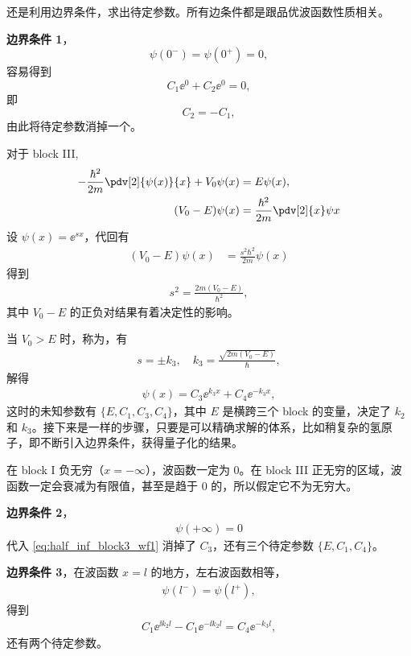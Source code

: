 还是利用边界条件，求出待定参数。所有边条件都是跟品优波函数性质相关。

\textbf{边界条件 1}，
\begin{equation}
    \psi(0^-) = \psi(0^+) = 0,
\end{equation}
容易得到
\begin{equation}
    C_1 \ee^0 + C_2 \ee^0 = 0,
\end{equation}
即
\begin{equation}
    C_2 = - C_1,
\end{equation}
由此将待定参数消掉一个。

对于 block III,
\begin{align}
    - \frac{\hbar^2}{2m} \pdv[2]{\psi(x)}{x} + V_0 \psi(x) &= E\psi(x), \\
    (V_0 - E) \psi(x)&= \frac{\hbar^2}{2m} \pdv[2]{x} \psi{x}
\end{align}
设 $\psi(x) = \ee^{sx}$，代回有
\begin{align}
    (V_0-E) \psi(x) &= \frac{s^2\hbar^2}{2m} \psi(x)
\end{align}
得到
\begin{eqnarray}
    s^2 = \frac{2m(V_0 - E)}{\hbar^2},
\end{eqnarray}
其中 $V_0 - E$ 的正负对结果有着决定性的影响。

当 $V_0 > E$ 时，称为，有
\begin{eqnarray}
    s = \pm k_3, \quad k_3 = \frac{\sqrt{2m(V_0 - E)}}{\hbar}, 
\end{eqnarray}
解得
\begin{eqnarray}
    \psi(x) = C_3 \ee^{k_3 x} + C_4 \ee^{-k_3 x},
    \label{eq:half_inf_block3_wf1}
\end{eqnarray}
这时的未知参数有 $\{E, C_1, C_3, C_4\}$，其中 $E$ 是横跨三个 block 的变量，决定了 $k_2$ 和 $k_3$。接下来是一样的步骤，只要是可以精确求解的体系，比如稍复杂的氢原子，即不断引入边界条件，获得量子化的结果。

在 block I 负无穷（$x=-\infty$），波函数一定为 0。在 block III 正无穷的区域，波函数一定会衰减为有限值，甚至是趋于 0 的，所以假定它不为无穷大。

\textbf{边界条件 2}，
\begin{eqnarray}
    \psi(+\infty) = 0 
\end{eqnarray}
代入 \eqref{eq:half_inf_block3_wf1} 消掉了 $C_3$，还有三个待定参数 $\{E, C_1, C_4\}$。

\textbf{边界条件 3}，在波函数 $x = l$ 的地方，左右波函数相等，
\begin{eqnarray}
    \psi(l^-) = \psi(l^+),
\end{eqnarray}
得到
\begin{eqnarray}
    C_1 \ee^{\ii k_2 l} - C_1 \ee^{-\ii k_2 l} = C_4 \ee^{-k_3 l}, \label{eq:half_condition_3}
\end{eqnarray}
还有两个待定参数。

